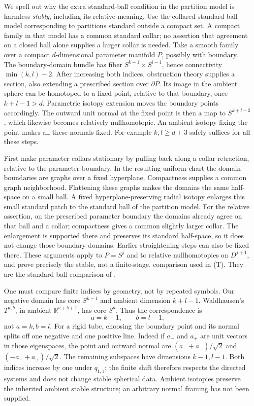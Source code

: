 \documentclass[11pt]{article}
\theoremstyle{remark}
\newcommand{\R}{\mathbb R}
\begin{document}
We spell out why the extra standard-ball condition in the partition
model is harmless \emph{stably}, including its relative meaning.
Use the collared standard-ball model corresponding to partitions
standard outside a compact set. A compact family in that model has
a common standard collar; no assertion that agreement on a closed
ball alone supplies a larger collar is needed.
Take a smooth family over a compact \(d\)-dimensional parameter
manifold \(P\), possibly with boundary. The boundary-domain bundle
has fiber \(S^{k-1}\times S^{l-1}\), hence connectivity
\(\min(k,l)-2\). After increasing both indices, obstruction theory
supplies a section, also extending a prescribed section over
\(\partial P\). Its image in the ambient sphere can be homotoped
to a fixed point, relative to that boundary, once \(k+l-1>d\).
Parametric isotopy extension moves the boundary points accordingly.
The outward unit normal at the fixed point is then a map to
\(S^{k+l-2}\), which likewise becomes relatively nullhomotopic.
An ambient isotopy fixing the point makes all these normals fixed.
For example \(k,l\geq d+3\) safely suffices for all these steps.

First make parameter collars stationary by pulling back along a
collar retraction, relative to the parameter boundary. In the
resulting uniform chart the domain boundaries are graphs over a
fixed hyperplane. Compactness supplies a common graph neighborhood.
Flattening these graphs makes the domains the same half-space on a
small ball. A fixed hyperplane-preserving radial isotopy enlarges
this small standard patch to the standard ball of the partition
model. For the relative assertion, on the prescribed parameter
boundary the domains already agree on that ball and a collar;
compactness gives a common slightly larger collar. The enlargement
is supported there and preserves its standard half-space, so it
does not change those boundary domains. Earlier straightening steps
can also be fixed there. These arguments apply to \(P=S^j\) and to
relative nullhomotopies on \(D^{j+1}\), and prove precisely the
stable, not a finite-stage, comparison used in (T). They are the
standard-ball comparison of \cite[Section 3.6]{AGIS}.

One must compare finite indices by geometry, not by repeated symbols.
Our negative domain has core \(S^{k-1}\) and ambient dimension
\(k+l-1\). Waldhausen's \(T^{a,b}\), in ambient
\(\R^{a+b+1}\), has core \(S^a\). Thus the correspondence is
\begin{equation}\label{eq:index-shift}
                 a=k-1,\qquad b=l-1,
\end{equation}
not \(a=k,b=l\). For a rigid tube, choosing the boundary point and
its normal splits off one negative and one positive line. Indeed if
\(a_-\) and \(a_+\) are unit vectors in those eigenspaces, the point
and outward normal are
\((a_-+a_+)/\sqrt2\) and \((-a_-+a_+)/\sqrt2\).
The remaining subspaces have dimensions \(k-1,l-1\).
Both indices increase by one under \(q_{1,1}\); the finite shift
therefore respects the directed systems and does not change stable
spherical data. Ambient isotopies preserve the inherited ambient
stable structure; an arbitrary normal framing has not been supplied.
\end{document}
